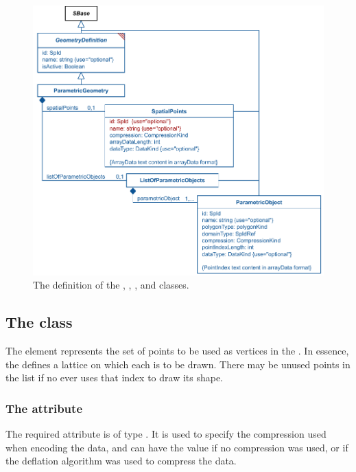 \begin{figure}[ht]
  \includegraphics{figs/ParametricGeometry-uml}
  \caption{The definition of the \ParametricGeometry, \SpatialPoints, \ListOfParametricObjects, and \ParametricObject classes.}
  \label{ParametricGeometry-uml}
  \label{SpatialPoints-uml}
  \label{ListOfParametricObjects-uml}
  \label{ParametricObject-uml}
  \label{PolygonObject-uml}
\end{figure}


\subsection{The  class}
\label{spatialpoints-class}
The \SpatialPoints element represents the set of points to be used as vertices in the \ParametricGeometry.  In essence, the \SpatialPoints defines a lattice on which each \ParametricObject is to be drawn.  There may be unused points in the list if no \ParametricObject ever uses that index to draw its shape.

\subsubsection{The \fixttspace{} attribute}
The required  attribute is of type . It is used to specify the compression used when encoding the data, and can have the value  if no compression was used, or  if the deflation algorithm was used to compress the data. 

